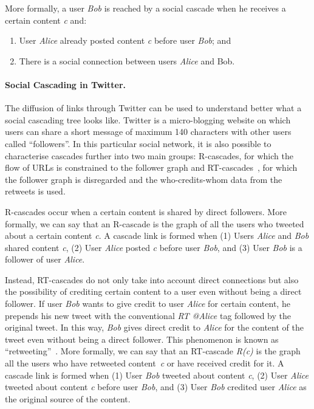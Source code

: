 More formally, a user \emph{Bob} is reached by a social cascade when he receives a certain content
\emph{c} and:
\begin{enumerate}
\singlespacing
	\item User \emph{Alice} already posted content \emph{c} before user \emph{Bob}; and
	\item There is a social connection between users \emph{Alice} and {Bob}.
\end{enumerate}
\paragraph{Social Cascading in Twitter.}
The diffusion of links through Twitter can be used to understand better what a social cascading tree
looks like. Twitter is a micro-blogging website on which users can share a short message of maximum 140
characters with other users called ``followers''. In this particular social network, it is also possible
to characterise cascades further into two main groups: R-cascades, for which the
flow of URLs is constrained to the follower graph and
RT-cascades~\cite{outweeting}, for which the follower graph is disregarded and
the who-credits-whom data from the retweets is used.

R-cascades occur when a certain content is shared by direct followers. More formally, we can
say that an R-cascade is the graph of all the users who tweeted about a certain
content \emph{c}. A cascade link is formed when (1) Users \emph{Alice} and \emph{Bob} shared content \emph{c}, (2) User
\emph{Alice} posted \emph{c} before user \emph{Bob}, and (3) User \emph{Bob} is a follower of user
\emph{Alice}.

Instead, RT-cascades do not only take into account direct connections but also the
possibility of crediting certain content to a user even without being a direct follower. If user
\emph{Bob} wants to give credit to user \emph{Alice} for certain content, he prepends his new tweet
with the conventional \emph{RT @Alice} tag followed by the original tweet. In this way, \emph{Bob} gives
direct credit to \emph{Alice} for the content of the tweet even without being a direct follower. This
phenomenon is known as ``retweeting''~\cite{retweet}. More formally, we can say that an RT-cascade
\emph{R(c)} is the graph all the users who have retweeted content~\emph{c} or have received credit for
it.
A cascade link is formed when (1) User \emph{Bob} tweeted about content \emph{c}, (2) User \emph{Alice}
tweeted about content \emph{c} before user \emph{Bob}, and (3) User \emph{Bob} credited user \emph{Alice}
as the original source of the content.
\vspace{-0.5cm}
